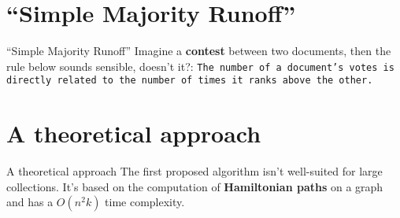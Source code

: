 \documentclass{beamer}
\begin{document}
        \section{``Simple Majority Runoff''}

        \begin{frame}{``Simple Majority Runoff''}
          Imagine a \textbf{contest} between two documents, then the rule below sounds sensible, doesn't it?: \newline \newline
          \texttt{The number of a document's votes is directly related to the number of times it ranks above the other.}
	\end{frame}


	\section{A theoretical approach}

        \begin{frame}{A theoretical approach}
           The first proposed algorithm isn't well-suited for large collections. \newline
	   It's based on the computation of \textbf{Hamiltonian paths} on a graph and has a
	   $O(n^{2}k)$ time complexity.
        \end{frame}

		
\end{document}
